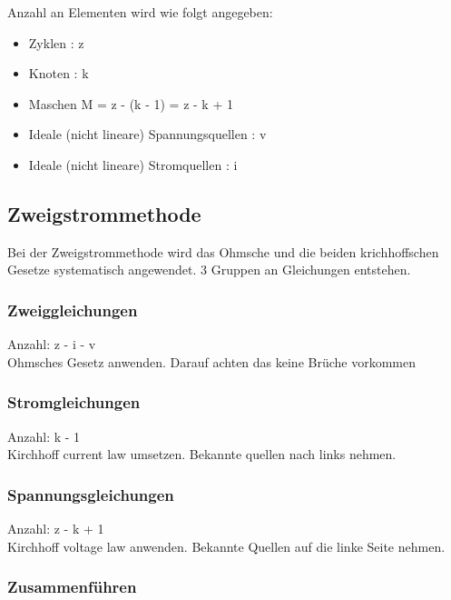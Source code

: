 \begin{center}
    
\end{center}

Anzahl an Elementen wird wie folgt angegeben:
\begin{itemize}
    \item Zyklen : z
    \item Knoten : k
    \item Maschen M = z - (k - 1) = z - k + 1
    \item Ideale (nicht lineare) Spannungsquellen : v
    \item Ideale (nicht lineare) Stromquellen : i
\end{itemize}

\subsection{Zweigstrommethode}

Bei der Zweigstrommethode wird das Ohmsche und die beiden krichhoffschen Gesetze systematisch angewendet. 
3 Gruppen an Gleichungen entstehen.

\subsubsection{Zweiggleichungen}

Anzahl: z - i - v\\
Ohmsches Gesetz anwenden. 
Darauf achten das keine Brüche vorkommen

\subsubsection{Stromgleichungen}

Anzahl: k - 1\\
Kirchhoff current law umsetzen. 
Bekannte quellen nach links nehmen.

\subsubsection{Spannungsgleichungen}

Anzahl: z - k + 1\\
Kirchhoff voltage law anwenden. 
Bekannte Quellen auf die linke Seite nehmen.


\subsubsection{Zusammenführen}

